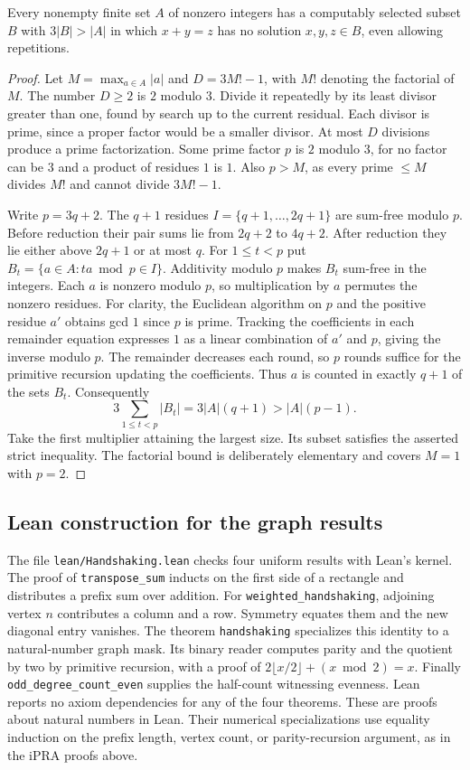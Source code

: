 \begin{theorem}\label{result34}\label{thm:graph-sumfree}
Every nonempty finite set $A$ of nonzero integers has a computably selected subset $B$ with $3|B|>|A|$ in which $x+y=z$ has no solution $x,y,z\in B$, even allowing repetitions.
\end{theorem}
\begin{proof}
Let $M=\max_{a\in A}|a|$ and $D=3M!-1$, with $M!$ denoting the factorial of $M$. The number $D\ge2$ is $2$ modulo $3$. Divide it repeatedly by its least divisor greater than one, found by search up to the current residual. Each divisor is prime, since a proper factor would be a smaller divisor. At most $D$ divisions produce a prime factorization. Some prime factor $p$ is $2$ modulo $3$, for no factor can be $3$ and a product of residues $1$ is $1$. Also $p>M$, as every prime $\le M$ divides $M!$ and cannot divide $3M!-1$.

Write $p=3q+2$. The $q+1$ residues $I=\{q+1,\ldots,2q+1\}$ are sum-free modulo $p$. Before reduction their pair sums lie from $2q+2$ to $4q+2$. After reduction they lie either above $2q+1$ or at most $q$. For $1\le t<p$ put $B_t=\{a\in A:ta\bmod p\in I\}$. Additivity modulo $p$ makes $B_t$ sum-free in the integers. Each $a$ is nonzero modulo $p$, so multiplication by $a$ permutes the nonzero residues. For clarity, the Euclidean algorithm on $p$ and the positive residue $a'$ obtains gcd $1$ since $p$ is prime. Tracking the coefficients in each remainder equation expresses $1$ as a linear combination of $a'$ and $p$, giving the inverse modulo $p$. The remainder decreases each round, so $p$ rounds suffice for the primitive recursion updating the coefficients. Thus $a$ is counted in exactly $q+1$ of the sets $B_t$. Consequently
\[
 3\sum_{1\le t<p}|B_t|=3|A|(q+1)>|A|(p-1).
\]
Take the first multiplier attaining the largest size. Its subset satisfies the asserted strict inequality. The factorial bound is deliberately elementary and covers $M=1$ with $p=2$.
\end{proof}

\subsection{Lean construction for the graph results}

The file \texttt{lean/Handshaking.lean} checks four uniform results with Lean's kernel. The proof of \texttt{transpose\_sum} inducts on the first side of a rectangle and distributes a prefix sum over addition. For \texttt{weighted\_handshaking}, adjoining vertex $n$ contributes a column and a row. Symmetry equates them and the new diagonal entry vanishes. The theorem \texttt{handshaking} specializes this identity to a natural-number graph mask. Its binary reader computes parity and the quotient by two by primitive recursion, with a proof of $2\lfloor x/2\rfloor+(x\bmod2)=x$. Finally \texttt{odd\_degree\_count\_even} supplies the half-count witnessing evenness. Lean reports no axiom dependencies for any of the four theorems. These are proofs about natural numbers in Lean. Their numerical specializations use equality induction on the prefix length, vertex count, or parity-recursion argument, as in the iPRA proofs above.


